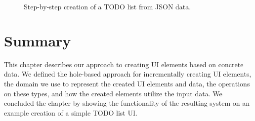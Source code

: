 \begin{figure}[p]
	\caption{Step-by-step creation of a TODO list from JSON data.}
	\label{fig:simple-todo-steps}
\end{figure}

\newpage
\section{Summary}

This chapter describes our approach to creating UI elements based on concrete data.
We defined the hole-based approach for incrementally creating UI elements, the domain we use to represent the created UI elements and data, the operations on these types, and how the created elements utilize the input data.
We concluded the chapter by showing the functionality of the resulting system on an example creation of a simple TODO list UI.


